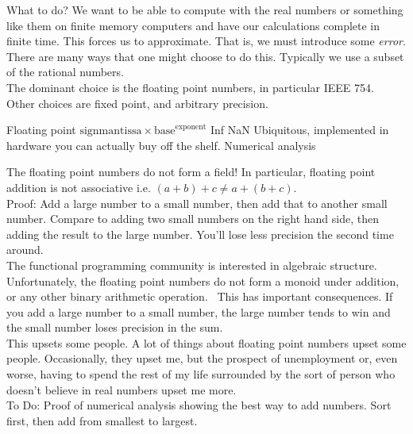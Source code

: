 \documentclass{beamer}
\begin{document}


\begin{frame}{What to do?}
We want to be able to compute with the real numbers or something like them on finite memory computers and 
have our calculations complete in finite time. This forces us to approximate. That is, we must introduce
some \emph{error}. \\
There are many ways that one might choose to do this. Typically we use a subset of
the rational numbers. \\
The dominant choice is the floating point numbers, in particular IEEE 754. \\
Other choices are fixed point, and arbitrary precision.
\end{frame}

\begin{frame}{Floating point}
$\text{sign} \text{mantissa} \times \text{base}^\text{exponent}$ Inf NaN
Ubiquitous, implemented in hardware you can actually buy off the shelf.
Numerical analysis
\end{frame}

\begin{frame}{The floating point numbers do not form a field!}
In particular, floating point addition is not associative i.e. $(a + b) + c \ne a + (b + c)$. \\
Proof: Add a large number to a small number, then add that to another small number.
Compare to adding two small numbers on the right hand side, then adding the result to the large number.
You'll lose less precision the second time around. \\
The functional programming community is interested in algebraic structure. Unfortunately, the floating
point numbers do not form a monoid under addition, or any other binary arithmetic operation. \
This has important consequences. If you add a large number to a small number, the large number tends to win
and the small number loses precision in the sum. \\
This upsets some people. A lot of things about floating point numbers upset some people. Occasionally, they
upset me, but the prospect of unemployment or, even worse, having to spend the rest of my life surrounded by
the sort of person who doesn't believe in real numbers upset me more. \\
To Do: Proof of numerical analysis showing the best way to add numbers. Sort first, then add from smallest to
largest.
\end{frame}
\end{document}
